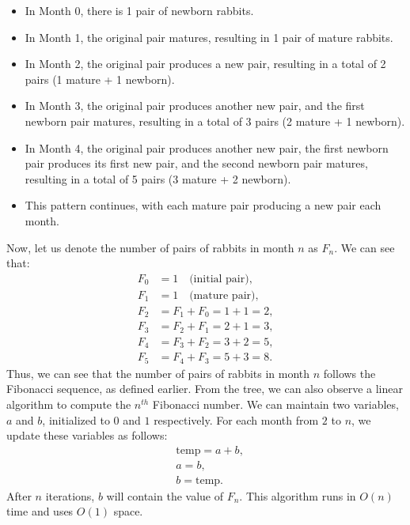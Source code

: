 \documentclass[openany]{book}
\begin{document}
\begin{itemize}
    \item In Month 0, there is 1 pair of newborn rabbits.
    \item In Month 1, the original pair matures, resulting in 1 pair of mature rabbits.
    \item In Month 2, the original pair produces a new pair, resulting in a total of 2 pairs (1 mature + 1 newborn).
    \item In Month 3, the original pair produces another new pair, and the first newborn pair matures, resulting in a total of 3 pairs (2 mature + 1 newborn).
    \item In Month 4, the original pair produces another new pair, the first newborn pair produces its first new pair, and the second newborn pair matures, resulting in a total of 5 pairs (3 mature + 2 newborn).
    \item This pattern continues, with each mature pair producing a new pair each month.
\end{itemize}
Now, let us denote the number of pairs of rabbits in month $n$ as $F_n$. We can see that:
\begin{align*}
    F_0 &= 1 \quad \text{(initial pair)}, \\
    F_1 &= 1 \quad \text{(mature pair)}, \\
    F_2 &= F_1 + F_0 = 1 + 1 = 2, \\
    F_3 &= F_2 + F_1 = 2 + 1 = 3, \\
    F_4 &= F_3 + F_2 = 3 + 2 = 5, \\
    F_5 &= F_4 + F_3 = 5 + 3 = 8.
\end{align*}
Thus, we can see that the number of pairs of rabbits in month $n$ follows the Fibonacci sequence, as defined earlier. From the tree, we can also observe a linear algorithm to compute the $n^{th}$ Fibonacci number. We can maintain two variables, $a$ and $b$, initialized to $0$ and $1$ respectively. For each month from $2$ to $n$, we update these variables as follows:
\begin{align*}
    &\text{temp} = a + b, \\
    &a = b, \\
    &b = \text{temp}.
\end{align*}
After $n$ iterations, $b$ will contain the value of $F_n$. This algorithm runs in $O(n)$ time and uses $O(1)$ space. 
\end{document}

